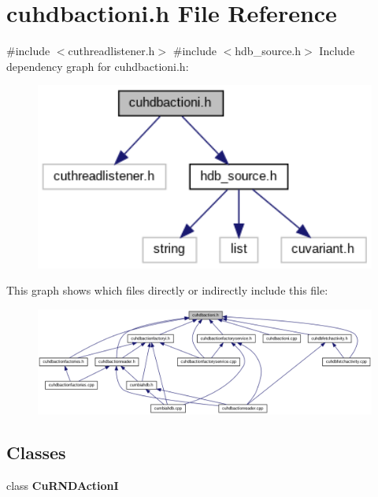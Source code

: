 \section{cuhdbactioni.\+h File Reference}
\label{cuhdbactioni_8h}
{\ttfamily \#include $<$cuthreadlistener.\+h$>$}\newline
{\ttfamily \#include $<$hdb\+\_\+source.\+h$>$}\newline
Include dependency graph for cuhdbactioni.\+h\+:
\nopagebreak
\begin{figure}[H]
\begin{center}
\leavevmode
\includegraphics[width=325pt]{cuhdbactioni_8h__incl}
\end{center}
\end{figure}
This graph shows which files directly or indirectly include this file\+:
\nopagebreak
\begin{figure}[H]
\begin{center}
\leavevmode
\includegraphics[width=350pt]{cuhdbactioni_8h__dep__incl}
\end{center}
\end{figure}
\subsection*{Classes}
\begin{DoxyCompactItemize}
\item 
class \textbf{ Cu\+R\+N\+D\+ActionI}
\end{DoxyCompactItemize}
